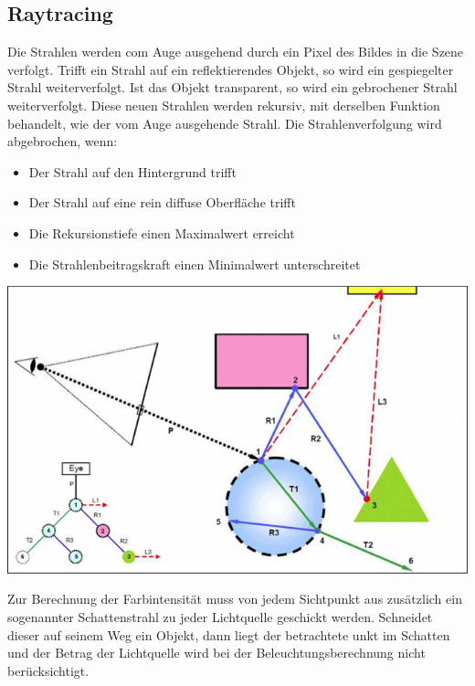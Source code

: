\documentclass[10pt]{article}
\begin{document}
\subsection{Raytracing}
Die Strahlen werden com Auge ausgehend durch ein Pixel des Bildes in die Szene verfolgt. Trifft ein Strahl auf ein reflektierendes Objekt, so wird ein gespiegelter Strahl weiterverfolgt. Ist das Objekt transparent, so wird ein gebrochener Strahl weiterverfolgt. Diese neuen Strahlen werden rekursiv, mit derselben Funktion behandelt, wie der vom Auge ausgehende Strahl. Die Strahlenverfolgung wird abgebrochen, wenn:
\begin{itemize}
	\item Der Strahl auf den Hintergrund trifft
	\item Der Strahl auf eine rein diffuse Oberfläche trifft
	\item Die Rekursionstiefe einen Maximalwert erreicht
	\item Die Strahlenbeitragskraft einen Minimalwert unterschreitet
\end{itemize}

\begin{center}
	\includegraphics[scale=0.4]{raytracing.png}
\end{center}

Zur Berechnung der Farbintensität muss von jedem Sichtpunkt aus zusätzlich ein sogenannter Schattenstrahl zu jeder Lichtquelle geschickt werden. Schneidet dieser auf seinem Weg ein Objekt, dann liegt der betrachtete unkt im Schatten und der Betrag der Lichtquelle wird bei der Beleuchtungsberechnung nicht berücksichtigt.
\end{document}
